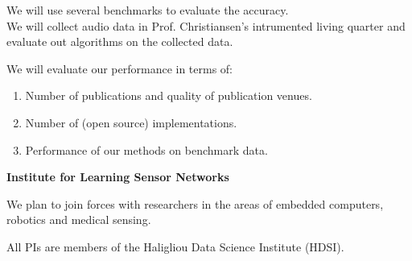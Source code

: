 \documentclass{article}
\begin{document}
We will use several benchmarks to evaluate the accuracy.
\\
We will collect audio data in Prof. Christiansen's intrumented living
quarter and evaluate out algorithms on the collected data.

We will evaluate our performance in terms of:
\begin{enumerate}
\item Number of publications and quality of publication venues.
\item Number of (open source) implementations.
\item Performance of our methods on benchmark data.
\end{enumerate}

{\bf Institute for Learning Sensor Networks}\\

We plan to join forces with researchers in the areas of embedded
computers, robotics and medical sensing.

All PIs are members of the Haligliou Data Science Institute (HDSI).

\bigskip
\end{document}
